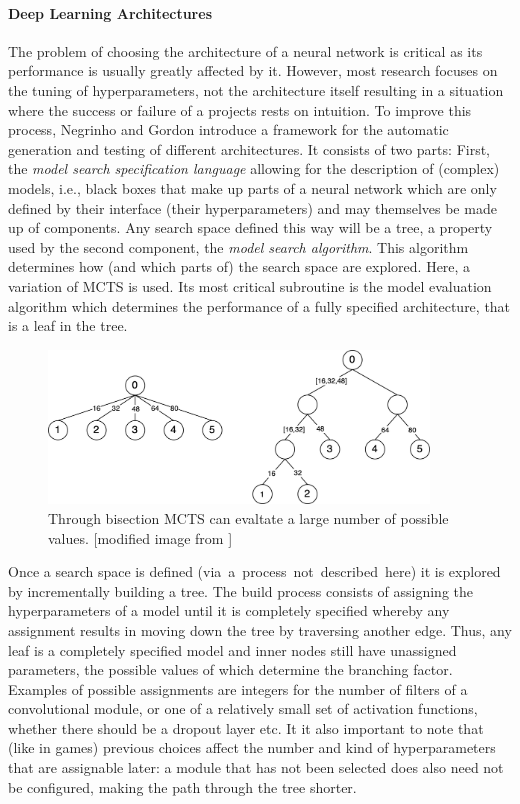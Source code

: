 \paragraph{Deep Learning Architectures}
The problem of choosing the architecture of a neural network is critical as its performance is usually greatly affected by it. However, most research focuses on the tuning of hyperparameters, not the architecture itself resulting in a situation where the success or failure of a projects rests on intuition. To improve this process, Negrinho and Gordon \cite{negrinho2017deeparchitect} introduce a framework for the automatic generation and testing of different architectures. It consists of two parts: First, the \textit{model search specification language} allowing for the description of (complex) models, i.e., black boxes that make up parts of a neural network which are only defined by their interface (their hyperparameters) and may themselves be made up of components. Any search space defined this way will be a tree, a property used by the second component, the \textit{model search algorithm}. This algorithm determines how (and which parts of) the search space are explored. Here, a variation of MCTS is used. Its most critical subroutine is the model evaluation algorithm which determines the performance of a fully specified architecture, that is a leaf in the tree. 
\begin{figure}[ht]
    \centering
    \includegraphics[width=0.9\textwidth]{img/deeparchitect.png}
    \caption{Through bisection MCTS can evaltate a large number of possible values. [modified image from \cite{negrinho2017deeparchitect}]}
    \label{fig:deep_architect}
\end{figure}
Once a search space is defined (via~a~process~not~described~here) it is explored by incrementally building a tree. The build process consists of assigning the hyperparameters of a model until it is completely specified whereby any assignment results in moving down the tree by traversing another edge. Thus, any leaf is a completely specified model and inner nodes still have unassigned parameters, the possible values of which determine the branching factor. Examples of possible assignments are integers for the number of filters of a convolutional module, or one of a relatively small set of activation functions, whether there should be a dropout layer etc. It it also important to note that (like in games) previous choices affect the number and kind of hyperparameters that are assignable later: a module that has not been selected does also need not be configured, making the path through the tree shorter.

